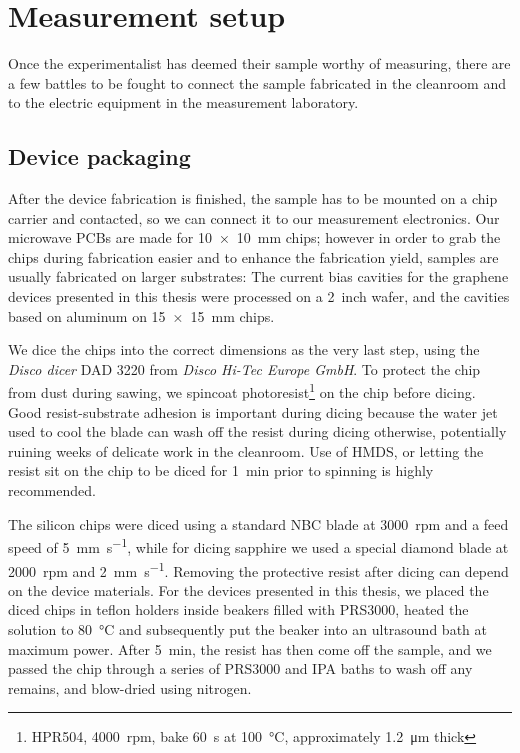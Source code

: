 \section{Measurement setup}

Once the experimentalist has deemed their sample worthy of measuring, there are a few battles to be fought to connect the sample fabricated in the cleanroom and to the electric equipment in the measurement laboratory.

\subsection{Device packaging}\label{sec:fab-packaging}

% 
After the device fabrication is finished, the sample has to be mounted on a chip carrier and contacted, so we can connect it to our measurement electronics.
% 
Our microwave PCBs are made for \SI{10x10}{\milli\meter} chips; however in order to grab the chips during fabrication easier and to enhance the fabrication yield, samples are usually fabricated on larger substrates:
% 
The current bias cavities for the graphene devices presented in this thesis were processed on a \SI{2}{inch} wafer, and the cavities based on aluminum on \SI{15x15}{\milli\meter} chips.

We dice the chips into the correct dimensions as the very last step, using the \textit{Disco dicer} DAD 3220 from \textit{Disco Hi-Tec Europe GmbH}.
% 
To protect the chip from dust during sawing, we spincoat photoresist\footnote{HPR504, \SI{4000}{rpm}, bake \SI{60}{\second} at \SI{100}{\celsius}, approximately \SI{1.2}{\micro\meter} thick} on the chip before dicing.
% 
Good resist-substrate adhesion is important during dicing because the water jet used to cool the blade can wash off the resist during dicing otherwise, potentially ruining weeks of delicate work in the cleanroom.
% 
Use of HMDS, or letting the resist sit on the chip to be diced for \SI{1}{\minute} prior to spinning is highly recommended.

The silicon chips were diced using a standard NBC blade at \SI{3000}{rpm} and a feed speed of \SI{5}{\milli\meter\per\second}, while for dicing sapphire we used a special diamond blade at \SI{2000}{rpm} and \SI{2}{\milli\meter\per\second}.
% 
Removing the protective resist after dicing can depend on the device materials.
% 
For the devices presented in this thesis, we placed the diced chips in teflon holders inside beakers filled with PRS3000, heated the solution to \SI{80}{\celsius} and subsequently put the beaker into an ultrasound bath at maximum power.
% 
After \SI{5}{\minute}, the resist has then come off the sample, and we passed the chip through a series of PRS3000 and IPA baths to wash off any remains, and blow-dried using nitrogen.

